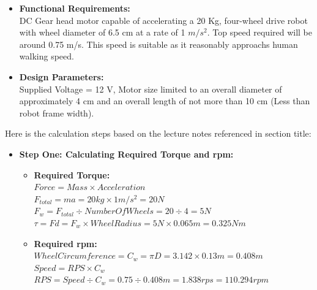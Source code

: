 \documentclass[12pt]{book}
\begin{document}
\begin{itemize}
	\item \textbf{Functional Requirements:}
	\\ DC Gear head motor capable of accelerating a 20 Kg, four-wheel drive robot with wheel diameter of 6.5 cm at a rate of 1 ${m/s^2}$. Top speed required will be around 0.75 m/s. This speed is suitable as it reasonably approachs human walking speed.
	\item \textbf{Design Parameters:}
	\\Supplied Voltage = 12 V, Motor size limited to an overall diameter of approximately 4 cm and an overall length of not more than 10 cm (Less than robot frame width).
\end{itemize}
Here is the calculation steps based on the lecture notes referenced in section title:
\begin{itemize}
	\item \textbf{Step One: Calculating Required Torque and rpm:}
	\begin{itemize}
		\item \textbf{Required Torque:} \\
		${Force = Mass \times Acceleration}$\\
		${F_{total} = ma = 20 kg \times 1 m/s^2 = 20 N}$\\
		${F_w = F_{total} \div NumberOfWheels = 20 \div 4 = 5N }$\\
		${\tau = F d = F_w \times WheelRadius = 5 N \times 0.065 m = 0.325 Nm}$\\
		
		
		
		\item \textbf{Required rpm:}\\
		${Wheel Circumference = C_w = \pi D = 3.142 \times 0.13 m = 0.408m}$\\
		${Speed = RPS \times C_w}$\\
		${RPS = Speed \div C_w = 0.75 \div 0.408m = 1.838 rps = 110.294 rpm}$\\
		
	\end{itemize}
	

\end{itemize}
\end{document}
